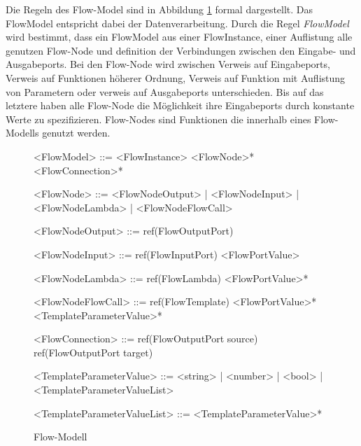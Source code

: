     Die Regeln des Flow-Model sind in Abbildung \cref{gra:flow-modell} formal dargestellt. Das FlowModel entspricht dabei der Datenverarbeitung. \cite{99}
    Durch die Regel \textit{FlowModel} wird bestimmt, dass ein FlowModel aus einer FlowInstance, einer Auflistung alle genutzen Flow-Node und definition der Verbindungen zwischen den Eingabe- und Ausgabeports.
    Bei den Flow-Node wird zwischen Verweis auf Eingabeports, Verweis auf Funktionen höherer Ordnung, Verweis auf Funktion mit Auflistung von Parametern oder verweis auf Ausgabeports unterschieden.
    Bis auf das letztere haben alle Flow-Node die Möglichkeit ihre Eingabeports durch konstante Werte zu spezifizieren.
    Flow-Nodes sind Funktionen die innerhalb eines Flow-Modells genutzt werden.
    \begin{figure}[H]
        \centering    
        \begin{grammar}
            <FlowModel> ::= <FlowInstance> <FlowNode>* <FlowConnection>*

            <FlowNode> ::= <FlowNodeOutput> | <FlowNodeInput> | <FlowNodeLambda> | <FlowNodeFlowCall>
        
            <FlowNodeOutput> ::= ref(FlowOutputPort)

            <FlowNodeInput> ::= ref(FlowInputPort) <FlowPortValue>

            <FlowNodeLambda> ::= ref(FlowLambda) <FlowPortValue>*

            <FlowNodeFlowCall> ::= ref(FlowTemplate) <FlowPortValue>* <TemplateParameterValue>*
        
            <FlowConnection> ::= ref(FlowOutputPort source) ref(FlowOutputPort target)
        
            <TemplateParameterValue> ::= <string> | <number> | <bool> | <TemplateParameterValueList>
        
            <TemplateParameterValueList> ::= <TemplateParameterValue>*
        \end{grammar}
        \caption{Flow-Modell}
        \label{gra:flow-modell}
    \end{figure}
    \noindent
